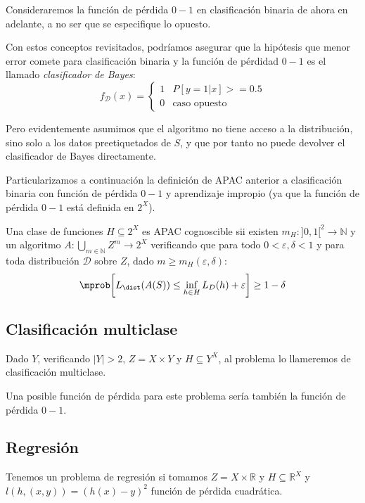 Consideraremos la función de pérdida $0-1$ en clasificación binaria de ahora en adelante, a no ser que se especifique
lo opuesto.

Con estos conceptos revisitados, podríamos asegurar que la hipótesis que menor error comete para 
clasificación binaria y la función de pérdidad $0-1$ es el llamado \textit{clasificador de Bayes}:
\[
  f_{\mathcal{D}}(x) = \left\{\begin{array}{ll}
                              1 & P [y = 1 |x] >= 0.5\\
                              0 & \textrm{caso opuesto}
                              \end{array}\right.
\]

Pero evidentemente asumimos que el algoritmo no tiene acceso a la distribución, sino solo a los datos 
preetiquetados de $S$, y que por tanto no puede devolver el clasificador de Bayes directamente.

Particularizamos a continuación la definición de APAC anterior a clasificación binaria
con función de pérdida $0-1$ y aprendizaje impropio (ya que la función de pérdida $0-1$ está definida 
en $2^X$).

\begin{definition}
Una clase de funciones $H \subseteq 2^X$ es APAC cognoscible sii existen 
$m_{H} : ]0,1[^2\rightarrow \mathbb{N}$ y un algoritmo $A: \underset{m\in \mathbb{N}}{\bigcup} Z^m \rightarrow 2^X$ verificando que para todo
$0 < \varepsilon, \delta < 1$ y para toda distribución $\mathcal{D}$ sobre $Z$, dado $m \ge m_H(\varepsilon, \delta)$:
\[
  \mprob \bigg[L_{\dist}(A(S)) \le \inf_{h\in H} L_D(h) + \varepsilon \bigg] \ge 1-\delta 
\]
\end{definition}

\subsection{Clasificación multiclase}
Dado $Y$, verificando $|Y| > 2$, $Z=X\times Y$ y $H\subseteq Y^X$, al problema lo llameremos de 
clasificación multiclase. 

Una posible función de pérdida para este problema sería también la función de pérdida $0-1$.

\subsection{Regresión}
Tenemos un problema de regresión si tomamos $Z=X \times \mathbb{R}$ y $H\subseteq \mathbb{R}^X$
y $l(h,(x,y)) = (h(x)-y)^2$ función de pérdida cuadrática.

